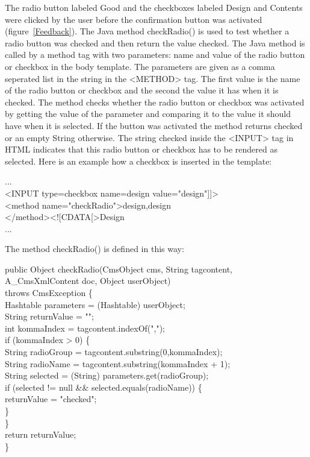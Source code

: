The radio button labeled {\name Good} and the checkboxes labeled {\name Design} and {\name Contents} were
clicked by the user before the confirmation button was activated (figure~\ref{Feedback}).
The Java method {\meth checkRadio()} is used to test whether a radio button was
checked and then return the value {\name checked}. 
The Java method  is called by a method tag with two parameters:
name and value of the radio button or checkbox in the body template.
The parameters are given as a comma seperated list in the string in the {\tag <METHOD>} tag. 
The first value is the name of the radio button or checkbox 
and the second the value it has when it is checked. 
The method checks whether the radio button or checkbox was activated by getting the value
of the parameter and comparing it to the value it should have when it is selected.
If the button was activated the method returns {\name checked} or an empty String otherwise.
The string {\name checked} inside the {\tag <INPUT>} tag in HTML indicates that this radio button or 
checkbox has to be rendered as selected.
Here is an example how a checkbox is inserted in the template:

\begin{java}
...\\
<INPUT type=checkbox name=design value="design"]]>\\
<method name="checkRadio">design,design\\
</method><![CDATA[>Design\\
...\\
\end{java}

The method {\meth checkRadio()} is defined in this way:

\begin{java}
public Object checkRadio(CmsObject cms, String tagcontent,\\
\jtabb           A\_CmsXmlContent doc, Object userObject)\\
\jtabb           throws CmsException \{\\
\jtaba        Hashtable parameters = (Hashtable) userObject;\\
\jtaba        String returnValue = "";\\
\jtaba        int kommaIndex = tagcontent.indexOf(",");\\
\jtaba        if (kommaIndex > 0) \{\\
\jtabb                String radioGroup = tagcontent.substring(0,kommaIndex);\\
\jtabb                String radioName = tagcontent.substring(kommaIndex + 1);\\
\jtabb                String selected = (String) parameters.get(radioGroup);\\
\jtabb                if (selected != null \&\& selected.equals(radioName)) \{\\
\jtabc                        returnValue = "checked";\\
\jtabb                \}\\
\jtaba        \}\\
\jtaba        return returnValue;\\
\}\\
\end{java}

